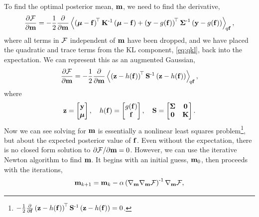 \documentclass{article} %
\begin{document}
To find the optimal posterior mean, $\pomean$, we need to find the derivative,
\begin{equation}
    \frac{\partial\Fengy}{\partial\pomean} = -\frac{1}{2}
    \frac{\partial}{\partial\pomean} \expec{q\lstate}{
        \brac{\prmean - \lstate}\transpose\prcov\inv
        \brac{\prmean - \lstate}
        + \brac{\obs - \nonlin{\lstate}}\transpose \lcov\inv
            \brac{\obs - \nonlin{\lstate}}},
\end{equation}
where all terms in $\Fengy$ independent of $\pomean$ have been dropped, and we
have placed the quadratic and trace terms from the KL component,
\eqref{eq:qkl}, back into the expectation. We can represent this as an
augmented Gaussian,
\begin{equation}
    \frac{\partial\Fengy}{\partial\pomean} = -\frac{1}{2}
        \frac{\partial}{\partial\pomean}
        \expec{q\lstate}{
        \brac{\augobs - \augnonlin{\lstate}}\transpose\augcov\inv
        \brac{\augobs - \augnonlin{\lstate}}
    },
    \label{eq:augsys}
\end{equation}
where
\begin{equation}
    \augobs = \begin{bmatrix} \obs \\ \prmean \end{bmatrix}, \quad
    \augnonlin{\lstate} = \begin{bmatrix} \nonlin{\lstate} \\ \lstate 
        \end{bmatrix}, \quad
    \augcov = \begin{bmatrix} \lcov & \mathbf{0} \\ \mathbf{0} & \prcov 
        \end{bmatrix}.
\end{equation}
Now we can see solving for $\pomean$ is essentially a nonlinear least squares 
problem\footnote{$-\frac{1}{2}
        \frac{\partial}{\partial\lstate}
        \brac{\augobs - \augnonlin{\lstate}}\transpose\augcov\inv
        \brac{\augobs - \augnonlin{\lstate}} = 0$.}, but about
the expected posterior value of $\lstate$. Even without the expectation, there
is no  closed form solution to $\partial\Fengy/\partial\pomean = 0$.
However, we can use the iterative Newton algorithm to find $\pomean$. It begins
with an initial guess, $\pomean_0$, then proceeds with the iterations,
\begin{equation}
    \pomean_{k+1} = \pomean_k -
    \step\brac{\nabla_\pomean\nabla_\pomean\Fengy}\inv \nabla_\pomean\Fengy,
    \label{eq:newton}
\end{equation}
\end{document}
